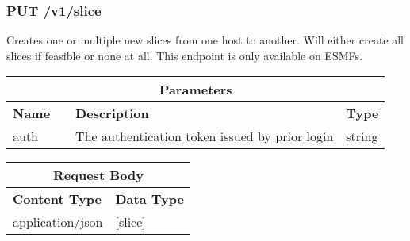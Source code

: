 \subsubsection{PUT /v1/slice}
Creates one or multiple new slices from one host to another. Will either create all slices if feasible or none at all. This endpoint is only available on ESMFs.
\begin{longtable}{ |p{2.5cm}|p{1.5cm}|p{4cm}|p{2cm}| }
\hline
\multicolumn{4}{|c|}{\textbf{Parameters}} \\
 \hline
\textbf{Name} & \centering{\textbf{Location}} & \textbf{Description} & \textbf{Type} \\
\hline
auth & \centering{QUERY} & The authentication token issued by prior login & string \\
 \hline
\endhead \end{longtable}

\begin{longtable}{ |p{3cm}|p{7.88cm}| }
\hline
\multicolumn{2}{|c|}{\textbf{Request Body}} \\
 \hline
\textbf{Content Type} & \textbf{Data Type} \\
\hline
application/json & [\hyperref[esmf_slice]{slice}] \\
 \hline
\end{longtable}

